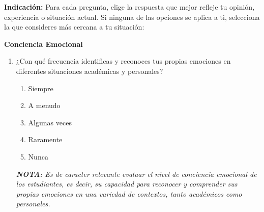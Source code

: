 \documentclass[journal]{IEEEtran}
\begin{document}
\textbf{Indicación:} Para cada pregunta, elige la respuesta que mejor refleje tu opinión, experiencia o situación actual. Si ninguna de las opciones se aplica a ti, selecciona la que consideres más cercana a tu situación:
\begin{center}
	\textbf{Conciencia Emocional}
\end{center}
\begin{enumerate}
	\item ¿Con qué frecuencia identificas y reconoces tus propias emociones en diferentes situaciones académicas y personales?
	\begin{enumerate}
		\item Siempre
		\item A menudo
		\item Algunas veces
		\item Raramente
		\item Nunca
	\end{enumerate}
	\textit{\textbf{NOTA:} Es de caracter relevante evaluar el nivel de conciencia emocional de los estudiantes, es decir, su capacidad para 				reconocer y comprender sus propias emociones en una variedad de contextos, tanto académicos como personales.}
	

\end{enumerate}
\end{document}
